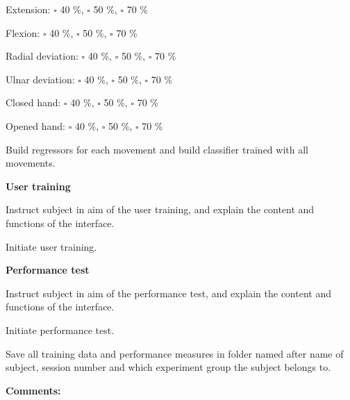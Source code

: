 \begin{todolist}
	\begin{todolist}
		\item Extension: $\square$ 40 \%, $\square$ 50 \%, $\square$ 70 \%
		\item Flexion: $\square$ 40 \%, $\square$ 50 \%, $\square$ 70 \%
		\item Radial deviation: $\square$ 40 \%, $\square$ 50 \%, $\square$ 70 \%
		\item Ulnar deviation: $\square$ 40 \%, $\square$ 50 \%, $\square$ 70 \%
		\item Closed hand: $\square$ 40 \%, $\square$ 50 \%, $\square$ 70 \%
		\item Opened hand: $\square$ 40 \%, $\square$ 50 \%, $\square$ 70 \%
	\end{todolist}
	\item Build regressors for each movement and build classifier trained with all movements.
\end{todolist}


\textbf{\large User training}

\begin{todolist}
	\item Instruct subject in aim of the user training, and explain the content and functions of the interface.
	\item Initiate user training.
\end{todolist}

\textbf{\large Performance test}

\begin{todolist}
	\item Instruct subject in aim of the performance test, and explain the content and functions of the interface.
	\item Initiate performance test.
	\item Save all training data and performance measures in folder named after name of subject, session number and which experiment group the subject belongs to.
\end{todolist}

\newpage
\textbf{\large Comments:}


